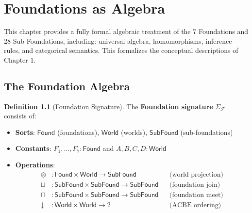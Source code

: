 \documentclass[11pt,twoside,openright]{book}
\theoremstyle{definition}
\newtheorem{definition}{Definition}[chapter]
\theoremstyle{plain}
\theoremstyle{remark}
\newcommand{\Foundations}{\mathcal{F}}
\begin{document}

\chapter{Foundations as Algebra}
\label{ch:foundations-algebra}

\begin{tcolorbox}[colback=purple!5!white,colframe=purple!75!black,title=\textbf{v7.3 New: Formal Algebraic Treatment}]
This chapter provides a fully formal algebraic treatment of the 7 Foundations and 28 Sub-Foundations, including: universal algebra, homomorphisms, inference rules, and categorical semantics. This formalizes the conceptual descriptions of Chapter 1.
\end{tcolorbox}

\section{The Foundation Algebra}
\label{sec:foundation-algebra}

\begin{definition}[Foundation Signature]
\label{def:foundation-signature}
The \textbf{Foundation signature} $\Sigma_\Foundations$ consists of:
\begin{itemize}
  \item \textbf{Sorts}: $\mathsf{Found}$ (foundations), $\mathsf{World}$ (worlds), $\mathsf{SubFound}$ (sub-foundations)
  \item \textbf{Constants}: $F_1, \ldots, F_7 : \mathsf{Found}$ and $A, B, C, D : \mathsf{World}$
  \item \textbf{Operations}:
  \begin{align*}
    \otimes &: \mathsf{Found} \times \mathsf{World} \to \mathsf{SubFound} && \text{(world projection)} \\
    \sqcup &: \mathsf{SubFound} \times \mathsf{SubFound} \to \mathsf{SubFound} && \text{(foundation join)} \\
    \sqcap &: \mathsf{SubFound} \times \mathsf{SubFound} \to \mathsf{SubFound} && \text{(foundation meet)} \\
    \downarrow &: \mathsf{World} \times \mathsf{World} \to 2 && \text{(ACBE ordering)}
  \end{align*}
\end{itemize}
\end{definition}
\end{document}
